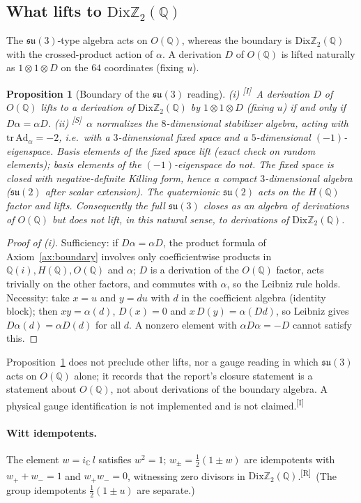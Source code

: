 \documentclass[11pt,a4paper]{article}
\newtheorem{proposition}[theorem]{Proposition}
\theoremstyle{definition}
\theoremstyle{remark}
\newcommand{\Q}{\mathbb{Q}}
\newcommand{\HQ}{H(\mathbb{Q})}
\newcommand{\OQ}{O(\mathbb{Q})}
\newcommand{\DZ}{\mathrm{Dix}\mathbb{Z}_2(\mathbb{Q})}
\newcommand{\tR}{\textsuperscript{[R]}}
\newcommand{\tS}{\textsuperscript{[S]}}
\newcommand{\tI}{\textsuperscript{[I]}}
\begin{document}
\subsection{What lifts to $\DZ$}
The $\mathfrak{su}(3)$-type algebra acts on $\OQ$, whereas the boundary is $\DZ$ with the crossed-product action of $\alpha$. A derivation $D$ of $\OQ$ is lifted naturally as $1\otimes1\otimes D$ on the $64$ coordinates (fixing $u$).
\begin{proposition}[Boundary of the $\mathfrak{su}(3)$ reading]\label{prop:lift}
(i) \tI\ A derivation $D$ of $\OQ$ lifts to a derivation of $\DZ$ by $1\otimes1\otimes D$ (fixing $u$) if and only if $D\alpha=\alpha D$. (ii) \tS\ $\alpha$ normalizes the $8$-dimensional stabilizer algebra, acting with $\mathrm{tr}\,\mathrm{Ad}_\alpha=-2$, i.e.\ with a $3$-dimensional fixed space and a $5$-dimensional $(-1)$-eigenspace. Basis elements of the fixed space lift (exact check on random elements); basis elements of the $(-1)$-eigenspace do not. The fixed space is closed with negative-definite Killing form, hence a compact $3$-dimensional algebra ($\mathfrak{su}(2)$ after scalar extension). The quaternionic $\mathfrak{su}(2)$ acts on the $\HQ$ factor and lifts. Consequently the full $\mathfrak{su}(3)$ closes as an algebra of derivations of $\OQ$ but does \emph{not} lift, in this natural sense, to derivations of $\DZ$.
\end{proposition}
\begin{proof}[Proof of (i)]
Sufficiency: if $D\alpha=\alpha D$, the product formula of Axiom~\ref{ax:boundary} involves only coefficientwise products in $\Q(i),\HQ,\OQ$ and $\alpha$; $D$ is a derivation of the $\OQ$ factor, acts trivially on the other factors, and commutes with $\alpha$, so the Leibniz rule holds. Necessity: take $x=u$ and $y=du$ with $d$ in the coefficient algebra (identity block); then $xy=\alpha(d)$, $D(x)=0$ and $x\,D(y)=\alpha(Dd)$, so Leibniz gives $D\alpha(d)=\alpha D(d)$ for all $d$. A nonzero element with $\alpha D\alpha=-D$ cannot satisfy this.
\end{proof}
\noindent Proposition~\ref{prop:lift} does not preclude other lifts, nor a gauge reading in which $\mathfrak{su}(3)$ acts on $\OQ$ alone; it records that the report's closure statement is a statement about $\OQ$, not about derivations of the boundary algebra. A physical gauge identification is not implemented and is not claimed.\tI

\paragraph{Witt idempotents.} The element $w=i_{\mathbb{C}}\,l$ satisfies $w^2=1$; $w_\pm=\tfrac12(1\pm w)$ are idempotents with $w_++w_-=1$ and $w_+w_-=0$, witnessing zero divisors in $\DZ$.\tR\ (The group idempotents $\tfrac12(1\pm u)$ are separate.)
\end{document}
